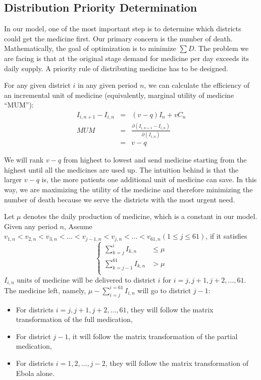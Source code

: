 \documentclass[12pt,a4paper,titlepage]{article}
\begin{document}
\subsection{Distribution Priority Determination}
\label{section_MUM}
In our model, one of the most important step is to determine which districts could get the medicine first. Our primary concern is the number of death. Mathematically, the goal of optimization is to minimize $\sum{D}$. The problem we are facing is that at the original stage demand for medicine per day exceeds its daily supply. A priority rule of distributing medicine has to be designed.

For any given district $i$ in any given period $n$, we can calculate the efficiency of an incremental unit of medicine (equivalently, marginal utility of medicine ``MUM''):
\begin{eqnarray}
    I_{i,n+1} - I_{i,n} & = & (v-q)I_{n}+vC_{n}\\
    MUM & = & \frac{\partial(I_{i,n+1}-I_{i,n})}{\partial(I_{i,n})}\\
        & = & v-q
\end{eqnarray}

We will rank $v-q$ from highest to lowest and send medicine starting from the highest until all the medicines are used up. The intuition behind is that the larger $v-q$ is, the more patients one additional unit of medicine can save. In this way, we are maximizing the utility of the medicine and therefore minimizing the number of death because we serve the districts with the most urgent need.

Let $\mu$ denotes the daily production of medicine, which is a constant in our model. 
Given any period $n$, Assume $v_{1,n}< v_{2,n}< v_{3,n}<...< v_{j-1,n} < v_{j,n}<...< v_{61,n} (1 \leq j \leq 61)$, if it satisfies
\begin{equation}
	\label{eqn_dynamicInfect_basic}
	\begin{cases}
		\sum_{k=j}^{i}I_{k, n} & \leq \mu  \\
		\sum_{k=j-1}^{61}I_{k, n} & > \mu  \\
	\end{cases}
\end{equation}
$I_{i,n}$ units of medicine will be delivered to district $i$ for $i=j,j+1,j+2,...,61$. The medicine left, namely, $\mu-\sum_{i=j}^{i=61}{I_{i,n}}$ will go to district $j-1$:
\begin{itemize}
    \item For districts $i=j,j+1,j+2,...,61$, they will follow the matrix transformation of the full medication,
    \item For district $j-1$, it will follow the matrix transformation of the partial medication,
    \item For districts $i=1,2,...,j-2$, they will follow the matrix transformation of Ebola alone.
\end{itemize}
\end{document}
